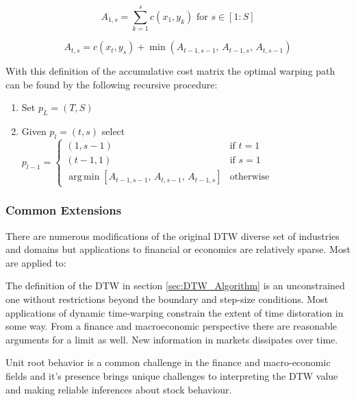 \documentclass[12pt]{article}
\DeclareMathOperator*{\argmin}{arg\,min}
\begin{document}
\begin{equation}
    A_{1,s} = \sum^{s}_{k=1} c(x_{1}, y_{k}) \,\, \textrm{for} \,\, s \in [1:S]
\end{equation}

\begin{equation}
    A_{t, s} = c(x_{t}, y_{s}) + \min\left(A_{t-1, s-1}, \, A_{t-1, s}, \, A_{t, s-1}\right)
\end{equation}

With this definition of the accumulative cost matrix the optimal warping path can be found by the following recursive procedure:

\begin{enumerate}
    \item Set $p_{L} = (T, S)$
    \item Given $p_{l} = (t, s)$ select $p_{l - 1} = \begin{cases} (1, s-1) & \textrm{if } t=1 \\ (t-1,1) & \textrm{if } s=1 \\ 
                                            \argmin \left[ A_{t-1, s-1},\, A_{t, s-1},\, A_{t-1, s} \right] & \textrm{otherwise} \end{cases}$
\end{enumerate}

\subsubsection{Common Extensions}

There are numerous modifications of the original DTW diverse set of industries and domains but applications to financial or economics are relatively sparse. Most are applied to:


The definition of the DTW in section \ref{sec:DTW_Algorithm} is an unconstrained one without restrictions beyond the boundary and step-size conditions. Most applications of dynamic time-warping constrain the extent of time distoration in some way. From a finance and macroeconomic perspective there are reasonable arguments for a limit as well. New information in markets dissipates over time.

Unit root behavior is a common challenge in the finance and macro-economic fields and it's presence brings unique challenges to interpreting the DTW value and making reliable inferences about stock behaviour. 
\end{document}
